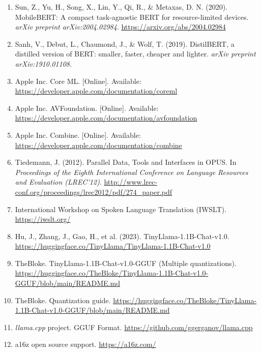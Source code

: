 \documentclass[12pt]{article}
\begin{document}
\begin{enumerate}
    \item Sun, Z., Yu, H., Song, X., Lin, Y., Qi, R., \& Metaxas, D. N. (2020). MobileBERT: A compact task-agnostic BERT for resource-limited devices. \textit{arXiv preprint arXiv:2004.02984}. \url{https://arxiv.org/abs/2004.02984} %
    \item Sanh, V., Debut, L., Chaumond, J., \& Wolf, T. (2019). DistilBERT, a distilled version of BERT: smaller, faster, cheaper and lighter. \textit{arXiv preprint arXiv:1910.01108}.
    \item Apple Inc. Core ML. [Online]. Available: \url{https://developer.apple.com/documentation/coreml}
    \item Apple Inc. AVFoundation. [Online]. Available: \url{https://developer.apple.com/documentation/avfoundation}
    \item Apple Inc. Combine. [Online]. Available: \url{https://developer.apple.com/documentation/combine}
    \item Tiedemann, J. (2012). Parallel Data, Tools and Interfaces in OPUS. In \textit{Proceedings of the Eighth International Conference on Language Resources and Evaluation (LREC'12)}. \url{http://www.lrec-conf.org/proceedings/lrec2012/pdf/274_paper.pdf} %
    \item International Workshop on Spoken Language Translation (IWSLT). \url{https://iwslt.org/}
    \item Hu, J., Zhang, J., Gao, H., et al. (2023). TinyLlama-1.1B-Chat-v1.0. \url{https://huggingface.co/TinyLlama/TinyLlama-1.1B-Chat-v1.0}
    \item TheBloke. TinyLlama-1.1B-Chat-v1.0-GGUF (Multiple quantizations). \url{https://huggingface.co/TheBloke/TinyLlama-1.1B-Chat-v1.0-GGUF/blob/main/README.md}
    \item TheBloke. Quantization guide. \url{https://huggingface.co/TheBloke/TinyLlama-1.1B-Chat-v1.0-GGUF/blob/main/README.md}
    \item \emph{llama.cpp} project. GGUF Format. \url{https://github.com/ggerganov/llama.cpp} %
    \item a16z open source support. \url{https://a16z.com/}
\end{enumerate}
\end{document}
